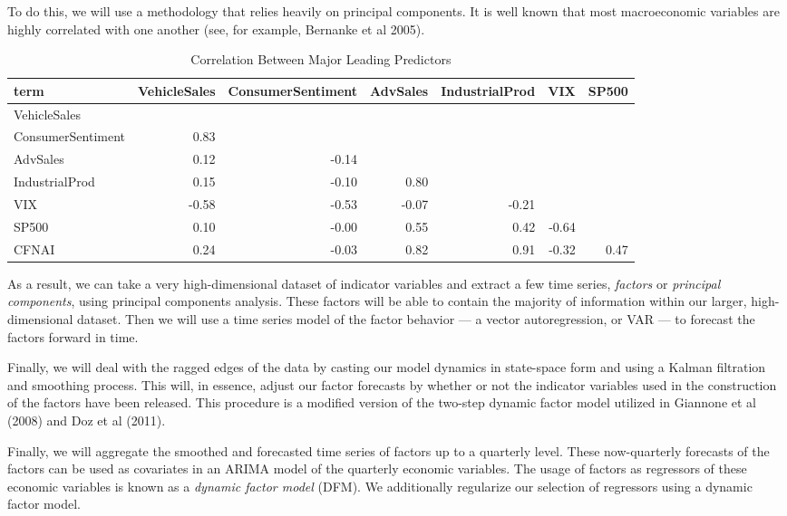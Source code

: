 \documentclass[11pt, letterpaper]{article}\usepackage[]{graphicx}\usepackage[]{color}
\begin{document}
To do this, we will use a methodology that relies heavily on principal components. It is well known that most macroeconomic variables are highly correlated with one another (see, for example, Bernanke et al 2005).
\begin{table}[H]
\centering
\begingroup\scriptsize
\begin{tabular}{lrrrrrr}
  \hline
term & VehicleSales & ConsumerSentiment & AdvSales & IndustrialProd & VIX & SP500 \\ 
  \hline
VehicleSales &  &  &  &  &  &  \\ 
  ConsumerSentiment & 0.83 &  &  &  &  &  \\ 
  AdvSales & 0.12 & -0.14 &  &  &  &  \\ 
  IndustrialProd & 0.15 & -0.10 & 0.80 &  &  &  \\ 
  VIX & -0.58 & -0.53 & -0.07 & -0.21 &  &  \\ 
  SP500 & 0.10 & -0.00 & 0.55 & 0.42 & -0.64 &  \\ 
  CFNAI & 0.24 & -0.03 & 0.82 & 0.91 & -0.32 & 0.47 \\ 
   \hline
\end{tabular}
\endgroup
\caption{Correlation Between Major Leading Predictors} 
\end{table}

As a result, we can take a very high-dimensional dataset of indicator variables and extract a few time series, \textit{factors} or \textit{principal components}, using principal components analysis. These factors will be able to contain the majority of information within our larger, high-dimensional dataset. Then we will use a time series model of the factor behavior --- a vector autoregression, or VAR --- to forecast the factors forward in time. 

Finally, we will deal with the ragged edges of the data by casting our model dynamics in state-space form and using a Kalman filtration and smoothing process. This will, in essence, adjust our factor forecasts by whether or not the indicator variables used in the construction of the factors have been released. This procedure is a modified version of the two-step dynamic factor model utilized in Giannone et al (2008) and Doz et al (2011).

Finally, we will aggregate the smoothed and forecasted time series of factors up to a quarterly level. These now-quarterly forecasts of the factors can be used as covariates in an ARIMA model of the quarterly economic variables. The usage of factors as regressors of these economic variables is known as a \textit{dynamic factor model} (DFM). We additionally regularize our selection of regressors using a dynamic factor model.
\end{document}
